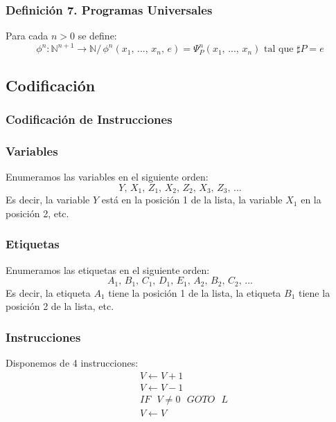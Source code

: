\documentclass{article}
\newcommand{\comma}{,\,}                                %
\newcommand{\tq}{/\,}                                   %
\newcommand{\naturales}{\mathbb{N}}                     %
\begin{document}
\subsubsection*{Definición 7. Programas Universales}
Para cada $n > 0$ se define:
\begin{equation*}
    \phi^n : \naturales^{n+1} \rightarrow \naturales \tq \phi^n (x_1 \comma ... \comma x_n \comma e) = \Psi_P^n (x_1 \comma ... \comma x_n) \text{ tal que } \sharp P = e
\end{equation*}

\subsection{Codificación}
\subsubsection{Codificación de Instrucciones}
\subsubsection*{Variables}
Enumeramos las variables en el siguiente orden:
\begin{equation*}
    Y \comma X_1 \comma Z_1 \comma X_2 \comma Z_2 \comma X_3 \comma Z_3 \comma ...
\end{equation*}
Es decir, la variable $Y$ está en la posición 1 de la lista, la variable $X_1$ en la posición 2, etc. 

\subsubsection*{Etiquetas}
Enumeramos las etiquetas en el siguiente orden:
\begin{equation*}
    A_1 \comma B_1 \comma C_1 \comma D_1 \comma E_1 \comma A_2 \comma B_2 \comma C_2 \comma ...
\end{equation*}
Es decir, la etiqueta $A_1$ tiene la posición 1 de la lista, la etiqueta $B_1$ tiene la posición 2 de la lista, etc.

\subsubsection*{Instrucciones}
Disponemos de 4 instrucciones:
\begin{align*}
    &V \leftarrow V + 1 \\
    &V \leftarrow V - 1 \\
    &\text{$IF$ $V \neq 0$ $GOTO$ $L$} \\
    &V \leftarrow V
\end{align*}
\end{document}
